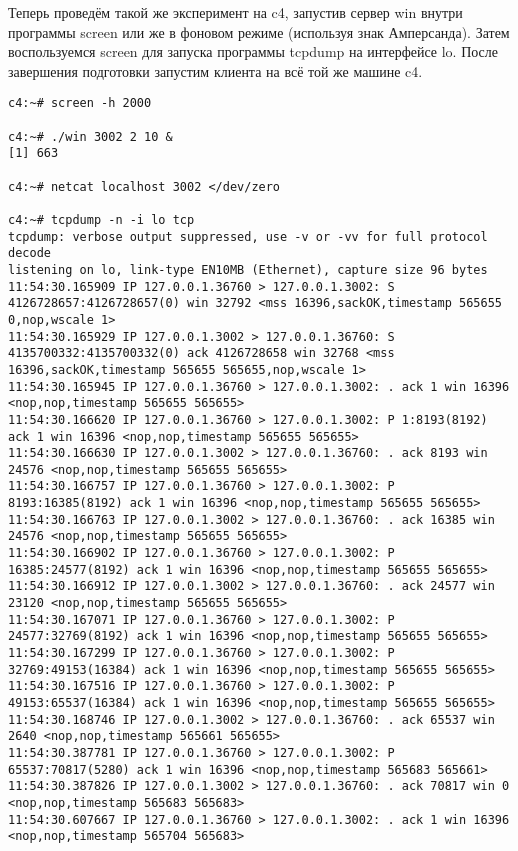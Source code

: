 \documentclass[a4paper,12pt]{article}
\begin{document}
Теперь проведём такой же эксперимент на c4, запустив сервер win внутри программы screen или же в фоновом режиме (используя знак Амперсанда). Затем воспользуемся screen для запуска программы tcpdump на интерфейсе lo. После завершения подготовки запустим клиента на всё той же
машине c4. 
\begin{lstlisting}
c4:~# screen -h 2000

c4:~# ./win 3002 2 10 &
[1] 663

c4:~# netcat localhost 3002 </dev/zero

c4:~# tcpdump -n -i lo tcp
tcpdump: verbose output suppressed, use -v or -vv for full protocol decode
listening on lo, link-type EN10MB (Ethernet), capture size 96 bytes
11:54:30.165909 IP 127.0.0.1.36760 > 127.0.0.1.3002: S 4126728657:4126728657(0) win 32792 <mss 16396,sackOK,timestamp 565655 0,nop,wscale 1>
11:54:30.165929 IP 127.0.0.1.3002 > 127.0.0.1.36760: S 4135700332:4135700332(0) ack 4126728658 win 32768 <mss 16396,sackOK,timestamp 565655 565655,nop,wscale 1>
11:54:30.165945 IP 127.0.0.1.36760 > 127.0.0.1.3002: . ack 1 win 16396 <nop,nop,timestamp 565655 565655>
11:54:30.166620 IP 127.0.0.1.36760 > 127.0.0.1.3002: P 1:8193(8192) ack 1 win 16396 <nop,nop,timestamp 565655 565655>
11:54:30.166630 IP 127.0.0.1.3002 > 127.0.0.1.36760: . ack 8193 win 24576 <nop,nop,timestamp 565655 565655>
11:54:30.166757 IP 127.0.0.1.36760 > 127.0.0.1.3002: P 8193:16385(8192) ack 1 win 16396 <nop,nop,timestamp 565655 565655>
11:54:30.166763 IP 127.0.0.1.3002 > 127.0.0.1.36760: . ack 16385 win 24576 <nop,nop,timestamp 565655 565655>
11:54:30.166902 IP 127.0.0.1.36760 > 127.0.0.1.3002: P 16385:24577(8192) ack 1 win 16396 <nop,nop,timestamp 565655 565655>
11:54:30.166912 IP 127.0.0.1.3002 > 127.0.0.1.36760: . ack 24577 win 23120 <nop,nop,timestamp 565655 565655>
11:54:30.167071 IP 127.0.0.1.36760 > 127.0.0.1.3002: P 24577:32769(8192) ack 1 win 16396 <nop,nop,timestamp 565655 565655>
11:54:30.167299 IP 127.0.0.1.36760 > 127.0.0.1.3002: P 32769:49153(16384) ack 1 win 16396 <nop,nop,timestamp 565655 565655>
11:54:30.167516 IP 127.0.0.1.36760 > 127.0.0.1.3002: P 49153:65537(16384) ack 1 win 16396 <nop,nop,timestamp 565655 565655>
11:54:30.168746 IP 127.0.0.1.3002 > 127.0.0.1.36760: . ack 65537 win 2640 <nop,nop,timestamp 565661 565655>
11:54:30.387781 IP 127.0.0.1.36760 > 127.0.0.1.3002: P 65537:70817(5280) ack 1 win 16396 <nop,nop,timestamp 565683 565661>
11:54:30.387826 IP 127.0.0.1.3002 > 127.0.0.1.36760: . ack 70817 win 0 <nop,nop,timestamp 565683 565683>
11:54:30.607667 IP 127.0.0.1.36760 > 127.0.0.1.3002: . ack 1 win 16396 <nop,nop,timestamp 565704 565683>

\end{lstlisting}
\end{document}
